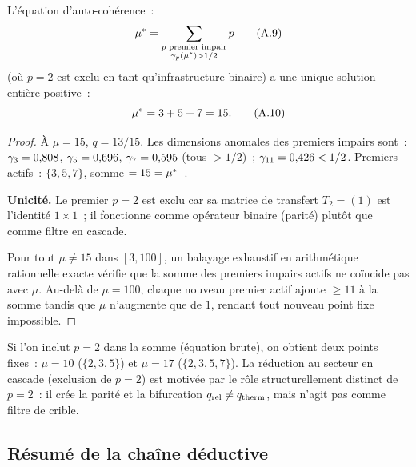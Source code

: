 \documentclass[12pt,a4paper]{article}
\providecommand{\qrel}{\ensuremath{q_{\mathrm{rel}}}}
\begin{document}
\begin{theorembox}
L'\'equation d'auto-coh\'erence~:
\begin{equation}
  {\mu^{*}} = \sum_{\substack{p \text{ premier impair} \\
  \gamma_{p}({\mu^{*}}) > 1/2}} p
  \tag{A.9}
\end{equation}
(o\`u $p = 2$ est exclu en tant qu'infrastructure binaire) a une
unique solution enti\`ere positive~:
\begin{equation}
  {\mu^{*}} = 3 + 5 + 7 = 15.
  \tag{A.10}
\end{equation}

\begin{proof}
\`A $\mu = 15$, $q = 13/15$. Les dimensions anomales des premiers
impairs sont~: $\gamma_{3} = 0{,}808$, $\gamma_{5} = 0{,}696$,
$\gamma_{7} = 0{,}595$ (tous $> 1/2$)~; $\gamma_{11} = 0{,}426 < 1/2$.
Premiers actifs~: $\{3,5,7\}$, somme $= 15 = {\mu^{*}}$~\checkmark.

\textbf{Unicit\'e.}
Le premier $p = 2$ est exclu car sa matrice de transfert $T_2 = (1)$
est l'identit\'e $1 \times 1$~; il fonctionne comme op\'erateur binaire
(parit\'e) plut\^ot que comme filtre en cascade.

Pour tout $\mu \neq 15$ dans $[3, 100]$, un balayage exhaustif en
arithm\'etique rationnelle exacte v\'erifie que la somme des premiers
impairs actifs ne co\"incide pas avec $\mu$. Au-del\`a de $\mu = 100$,
chaque nouveau premier actif ajoute $\geq 11$ \`a la somme tandis que
$\mu$ n'augmente que de $1$, rendant tout nouveau point fixe impossible.
\end{proof}
\end{theorembox}

\begin{remark}
Si l'on inclut $p = 2$ dans la somme (\'equation brute), on obtient
deux points fixes~: $\mu = 10$ ($\{2,3,5\}$) et $\mu = 17$
($\{2,3,5,7\}$). La r\'eduction au secteur en cascade (exclusion de
$p = 2$) est motiv\'ee par le r\^ole structurellement distinct de
$p = 2$~: il cr\'ee la parit\'e et la bifurcation
$\qrel \neq \qtherm$, mais n'agit pas comme filtre de crible.
\end{remark}

\subsection{R\'esum\'e de la cha\^ine d\'eductive}
\label{app:summary}
\end{document}

